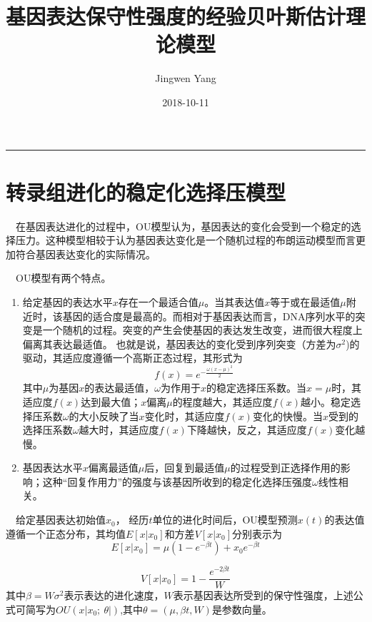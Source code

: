 \documentclass[hyperref,]{ctexart}
\title{基因表达保守性强度的经验贝叶斯估计理论模型}
\author{Jingwen Yang}
\date{2018-10-11}
\begin{document}
\maketitle

{
\setcounter{tocdepth}{2}
\tableofcontents
}
\begin{center}\rule{0.5\linewidth}{\linethickness}\end{center}

\section{转录组进化的稳定化选择压模型}

 在基因表达进化的过程中，OU模型认为，基因表达的变化会受到一个稳定的选择压力。这种模型相较于认为基因表达变化是一个随机过程的布朗运动模型而言更加符合基因表达变化的实际情况。

 OU模型有两个特点。

\begin{enumerate}
\def\labelenumi{\arabic{enumi}.}
\item
  给定基因的表达水平\(x\)存在一个最适合值\(\mu\)。当其表达值\(x\)等于或在最适值\(\mu\)附近时，该基因的适合度是最高的。而相对于基因表达而言，DNA序列水平的突变是一个随机的过程。突变的产生会使基因的表达发生改变，进而很大程度上偏离其表达最适值。
  也就是说，基因表达的变化受到序列突变（方差为\(\sigma^2\))的驱动，其适应度遵循一个高斯正态过程，其形式为
  \[f\left(x\right)=e^{-\frac{\omega\left(x-\mu\right)^2}{2}}\]
  其中\(\mu\)为基因\(x\)的表达最适值，\(\omega\)为作用于\(x\)的稳定选择压系数。当\(x=\mu\)时，其适应度\(f\left(x\right)\)达到最大值；\(x\)偏离\(\mu\)的程度越大，其适应度\(f(x)\)越小。稳定选择压系数\(\omega\)的大小反映了当\(x\)变化时，其适应度\(f(x)\)变化的快慢。当\(x\)受到的选择压系数\(\omega\)越大时，其适应度\(f(x)\)下降越快，反之，其适应度\(f(x)\)变化越慢。
\item
  基因表达水平\(x\)偏离最适值\(\mu\)后，回复到最适值\(\mu\)的过程受到正选择作用的影响；这种``回复作用力''的强度与该基因所收到的稳定化选择压强度\(\omega\)线性相关。
\end{enumerate}

 给定基因表达初始值\(x_0\)，
经历\(t\)单位的进化时间后，OU模型预测\(x(t)\)的表达值遵循一个正态分布，其均值\(E[x|x_0]\)和方差\(V[x|x_0]\)分别表示为
\[E\left[x|x_0\right]=\mu\left(1-e^{-\beta t}\right)+x_0e^{-\beta t}\]

\[V\left[x|x_0\right]=1-\frac{e^{-2\beta t}}{W}\]
其中\(\beta=W\sigma^2\)表示表达的进化速度，\(W\)表示基因表达所受到的保守性强度，上述公式可简写为\(OU\left(x\left|x_0;\  \theta\right|\right)\),其中\(\theta=(\mu, \beta t, W)\)是参数向量。
\end{document}
